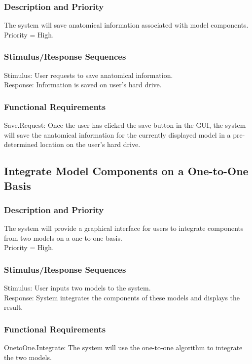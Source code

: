 \documentclass{article}
\begin{document}
\subsubsection{Description and Priority}
The system will save anatomical information associated with model components.\\
Priority = High.

\subsubsection{Stimulus/Response Sequences}
Stimulus: User requests to save anatomical information.\\
Response: Information is saved on user's hard drive.

\subsubsection{Functional Requirements}
Save.Request: Once the user has clicked the save button in the GUI, the system will save the anatomical information for the currently displayed model in a pre-determined location on the user's hard drive.

\subsection{Integrate Model Components on a One-to-One Basis}
\subsubsection{Description and Priority}
The system will provide a graphical interface for users to integrate components from two models on a one-to-one basis.\\
Priority = High.

\subsubsection{Stimulus/Response Sequences}
Stimulus: User inputs two models to the system.\\
Response: System integrates the components of these models and displays the result.

\subsubsection{Functional Requirements}
OnetoOne.Integrate: The system will use the one-to-one algorithm to integrate the two models.
\end{document}
